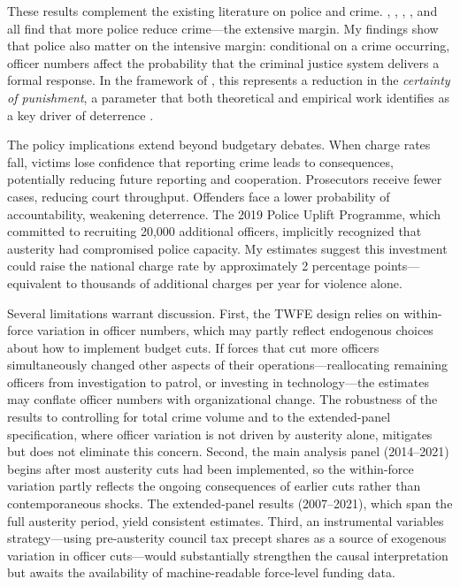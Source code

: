 \documentclass[12pt]{article}
\begin{document}
These results complement the existing literature on police and crime. \citet{levitt1997}, \citet{diTella2004}, \citet{klick2005}, \citet{draca2011}, and \citet{mello2019} all find that more police reduce crime---the extensive margin. My findings show that police also matter on the intensive margin: conditional on a crime occurring, officer numbers affect the probability that the criminal justice system delivers a formal response. In the framework of \citet{becker1968}, this represents a reduction in the \textit{certainty of punishment}, a parameter that both theoretical and empirical work identifies as a key driver of deterrence \citep{nagin2013, chalfin2015}.

The policy implications extend beyond budgetary debates. When charge rates fall, victims lose confidence that reporting crime leads to consequences, potentially reducing future reporting and cooperation. Prosecutors receive fewer cases, reducing court throughput. Offenders face a lower probability of accountability, weakening deterrence. The 2019 Police Uplift Programme, which committed to recruiting 20,000 additional officers, implicitly recognized that austerity had compromised police capacity. My estimates suggest this investment could raise the national charge rate by approximately 2 percentage points---equivalent to thousands of additional charges per year for violence alone.

Several limitations warrant discussion. First, the TWFE design relies on within-force variation in officer numbers, which may partly reflect endogenous choices about how to implement budget cuts. If forces that cut more officers simultaneously changed other aspects of their operations---reallocating remaining officers from investigation to patrol, or investing in technology---the estimates may conflate officer numbers with organizational change. The robustness of the results to controlling for total crime volume and to the extended-panel specification, where officer variation is not driven by austerity alone, mitigates but does not eliminate this concern. Second, the main analysis panel (2014--2021) begins after most austerity cuts had been implemented, so the within-force variation partly reflects the ongoing consequences of earlier cuts rather than contemporaneous shocks. The extended-panel results (2007--2021), which span the full austerity period, yield consistent estimates. Third, an instrumental variables strategy---using pre-austerity council tax precept shares as a source of exogenous variation in officer cuts---would substantially strengthen the causal interpretation but awaits the availability of machine-readable force-level funding data.
\end{document}

